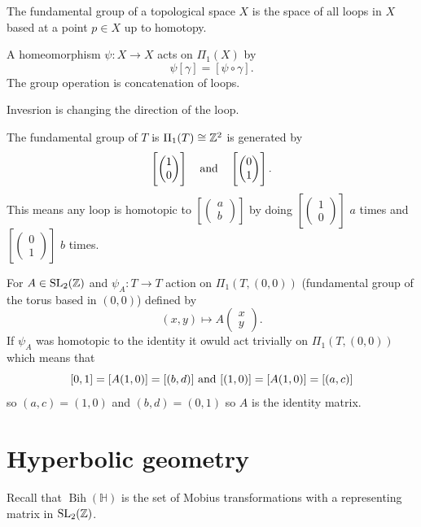 \documentclass[11pt,a4paper]{article}
\DeclareMathOperator{\Bih}{Bih}
\renewcommand{\H}{\mathbb H}
\begin{document}
\begin{definition}
  The fundamental group of a topological space $X$ is the space of all loops
  in $X$ based at a point $p \in X$ up to homotopy.
\end{definition}
 
A homeomorphism $\psi \colon X \to X$ acts on $\Pi_1(X)$ by
\[
  \psi[\gamma] = [\psi \circ \gamma].
\]
The group operation is concatenation of loops.

Invesrion is changing the direction of the loop.

\begin{exercise}
  The fundamental group of $T$ is $\Pi_1(T) \cong \mathbb{Z}^2$ is generated
  by \[\left[\begin{pmatrix} 1 \\ 0 \end{pmatrix}\right] \quad \text{and} \quad
  \left[\begin{pmatrix} 0 \\ 1 \end{pmatrix}\right].\]
  This means any loop is homotopic to
  $[\begin{pmatrix} a \\ b \end{pmatrix}]$
  by doing $[\begin{pmatrix} 1 \\ 0 \end{pmatrix}]$ $a$ times
  and $[\begin{pmatrix} 0 \\ 1 \end{pmatrix}]$ $b$ times.
\end{exercise}

For $A \in \operatorname{SL}_2(\mathbb{Z})$ and $\psi_A \colon T \to T$ action on
$\Pi_1(T, (0,0))$ (fundamental group of the torus based in $(0,0)$)
defined by
\[
  (x,y) \mapsto A \begin{pmatrix} x \\ y \end{pmatrix}.
\]
If $\psi_A$ was homotopic to the identity it owuld act trivially on
$\Pi_1(T, (0,0))$ which means that
\[
  [0,1] = [A (1,0)] = [(b,d)] \text{ and } [(1,0)] = [A(1,0)] = [(a,c)]
\]
so $(a,c) = (1,0)$ and $(b,d) = (0,1)$ so $A$ is the identity matrix.

\newpage

\section{Hyperbolic geometry}
Recall that $\Bih(\H)$ is the set of Mobius transformations with a representing
matrix in $\operatorname{SL}_2(\mathbb{Z})$.
\end{document}
